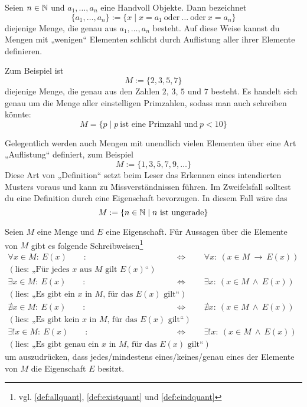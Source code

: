 \begin{nota} \label{auflistung}
    Seien $n\in \mathbb N$ und $a_1,\dots , a_n$ eine Handvoll Objekte. Dann bezeichnet
        \[ \{a_1,\dots , a_n\} := \{ x\mid x=a_1\ \text{oder}\ \ldots\ \text{oder}\ x=a_n \} \]
    diejenige Menge, die genau aus $a_1,\dots , a_n$ besteht. Auf diese Weise kannst du Mengen mit „wenigen“ Elementen schlicht durch Auflistung aller ihrer Elemente definieren.
\end{nota}


\begin{bsp}
    Zum Beispiel ist
        \[ M:=\{2,3,5,7\} \]
    diejenige Menge, die genau aus den Zahlen $2$, $3$, $5$ und $7$ besteht. Es handelt sich genau um die Menge aller einstelligen Primzahlen, sodass man auch schreiben könnte:
        \[ M = \{p\mid p\ \text{ist eine Primzahl und}\ p <10 \} \]
\end{bsp}


\begin{bem}
    Gelegentlich werden auch Mengen mit unendlich vielen Elementen über eine Art „Auflistung“ definiert, zum Beispiel
        \[ M := \{1, 3, 5, 7, 9,\ldots \} \]
    Diese Art von „Definition“ setzt beim Leser das Erkennen eines intendierten Musters voraus und kann zu Missverständnissen führen. Im Zweifelsfall solltest du eine Definition durch eine Eigenschaft bevorzugen. In diesem Fall wäre das
        \[ M := \{n \in \mathbb N \mid n\ \text{ist ungerade} \} \]
\end{bem}


\begin{nota}[*] \label{beschraenktquant}
    Seien $M$ eine Menge und $E$ eine Eigenschaft. Für Aussagen über die Elemente von $M$ gibt es folgende Schreibweisen\footnote{vgl. \cref{def:allquant}, \cref{def:existquant} und \cref{def:eindquant}}
    \begin{align*}
        \forall x\in M:\ E(x) \qquad :& \Leftrightarrow\qquad \forall x:\ (x\in M\ \to\ E(x))  \\
        (\text{lies: „Für jedes $x$ aus $M$ gilt $E(x)$“}) & \\[0.5em]
        \exists x\in M:\ E(x) \qquad :& \Leftrightarrow\qquad \exists x:\ (x\in M\ \land\ E(x))  \\
        (\text{lies: „Es gibt ein $x$ in $M$, für das $E(x)$ gilt“}) & \\[0.5em]
        \nexists x\in M:\ E(x) \qquad :& \Leftrightarrow\qquad \nexists x:\ (x\in M\ \land\ E(x))  \\
        (\text{lies: „Es gibt kein $x$ in $M$, für das $E(x)$ gilt“}) & \\[0.5em]
        \exists ! x\in M :\ E(x) \qquad :& \Leftrightarrow\qquad \exists ! x:\ (x\in M\ \land\ E(x)) \\ (\text{lies: „Es gibt genau ein $x$ in $M$, für das $E(x)$ gilt“})
    \end{align*}
    um auszudrücken, dass jedes/mindestens eines/keines/genau eines der Elemente von $M$ die Eigenschaft $E$ besitzt.
\end{nota}


